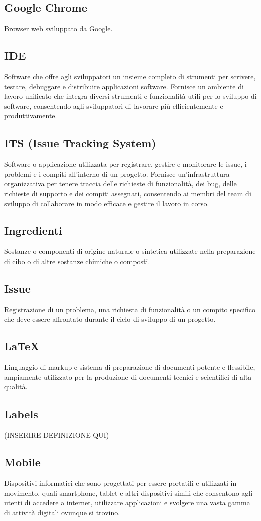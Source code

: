 \subsection{Google Chrome}Browser web sviluppato da Google.
\subsection{IDE}Software che offre agli sviluppatori un insieme completo di strumenti per scrivere, testare, debuggare e distribuire applicazioni software. Fornisce un ambiente di lavoro unificato che integra diversi strumenti e funzionalità utili per lo sviluppo di software, consentendo agli sviluppatori di lavorare più efficientemente e produttivamente.
\subsection{ITS (Issue Tracking System)}Software o applicazione utilizzata per registrare, gestire e monitorare le issue, i problemi e i compiti all'interno di un progetto. Fornisce un'infrastruttura organizzativa per tenere traccia delle richieste di funzionalità, dei bug, delle richieste di supporto e dei compiti assegnati, consentendo ai membri del team di sviluppo di collaborare in modo efficace e gestire il lavoro in corso.
\subsection{Ingredienti}Sostanze o componenti di origine naturale o sintetica utilizzate nella preparazione di cibo o di altre sostanze chimiche o composti.
\subsection{Issue}Registrazione di un problema, una richiesta di funzionalità o un compito specifico che deve essere affrontato durante il ciclo di sviluppo di un progetto.
\subsection{LaTeX}Linguaggio di markup e sistema di preparazione di documenti potente e flessibile, ampiamente utilizzato per la produzione di documenti tecnici e scientifici di alta qualità.
\subsection{Labels} (INSERIRE DEFINIZIONE QUI)
\subsection{Mobile}Dispositivi informatici che sono progettati per essere portatili e utilizzati in movimento, quali smartphone, tablet e altri dispositivi simili che consentono agli utenti di accedere a internet, utilizzare applicazioni e svolgere una vasta gamma di attività digitali ovunque si trovino.
